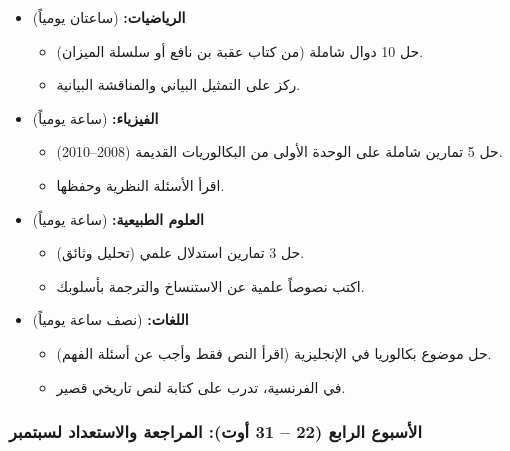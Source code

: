 \documentclass[12pt,a4paper]{book}
\begin{document}
	\begin{itemize}
		\item \textbf{الرياضيات:} (ساعتان يومياً)
		\begin{itemize}
			\item حل 10 دوال شاملة (من كتاب عقبة بن نافع أو سلسلة الميزان).
			\item ركز على التمثيل البياني والمناقشة البيانية.
		\end{itemize}
		\item \textbf{الفيزياء:} (ساعة يومياً)
		\begin{itemize}
			\item حل 5 تمارين شاملة على الوحدة الأولى من البكالوريات القديمة (2008–2010).
			\item اقرأ الأسئلة النظرية وحفظها.
		\end{itemize}
		\item \textbf{العلوم الطبيعية:} (ساعة يومياً)
		\begin{itemize}
			\item حل 3 تمارين استدلال علمي (تحليل وثائق).
			\item اكتب نصوصاً علمية عن الاستنساخ والترجمة بأسلوبك.
		\end{itemize}
		\item \textbf{اللغات:} (نصف ساعة يومياً)
		\begin{itemize}
			\item حل موضوع بكالوريا في الإنجليزية (اقرأ النص فقط وأجب عن أسئلة الفهم).
			\item في الفرنسية، تدرب على كتابة  لنص تاريخي قصير.
		\end{itemize}
	\end{itemize}
	
	\subsubsection{الأسبوع الرابع (22 – 31 أوت): المراجعة والاستعداد لسبتمبر}
	
\end{document}
